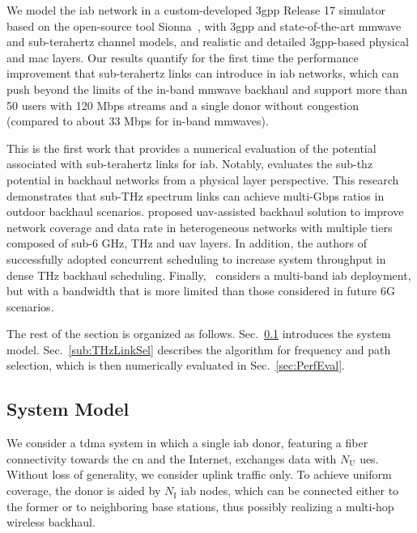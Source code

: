 We model the \gls{iab} network in a custom-developed \gls{3gpp} Release 17 simulator based on the open-source tool Sionna~\cite{hoydis2022sionna}, with \gls{3gpp} and state-of-the-art \gls{mmwave} and sub-terahertz channel models, and realistic and detailed \gls{3gpp}-based physical and \gls{mac} layers. Our results quantify for the first time the performance improvement that sub-terahertz links can introduce in \gls{iab} networks, which can push beyond the limits of the in-band \gls{mmwave} backhaul and support more than 50 users with 120 Mbps streams and a single donor without congestion (compared to about 33 Mbps for in-band \glspl{mmwave}). 

This is the first work that provides a numerical evaluation of the potential associated with sub-terahertz links for \gls{iab}. Notably, \cite{9135258} evaluates the sub-\gls{thz} potential in backhaul networks from a physical layer perspective. This research demonstrates that sub-THz spectrum links can achieve multi-Gbps ratios in outdoor backhaul scenarios. \cite{9163026} proposed \gls{uav}-assisted backhaul solution to improve network coverage and data rate in heterogeneous networks with multiple tiers composed of sub-6 GHz, THz and \gls{uav} layers. In addition, the authors of \cite{9136652} successfully adopted concurrent scheduling to increase system throughput in dense THz backhaul scheduling. Finally,~\cite{saha2018integrated} considers a multi-band \gls{iab} deployment, but with a bandwidth that is more limited than those considered in future 6G scenarios. 

The rest of the section is organized as follows. Sec.~\ref{sec:system} introduces the system model. Sec.~\ref{sub:THzLinkSel} describes the algorithm for frequency and path selection, which is then numerically evaluated in Sec.~\ref{sec:PerfEval}.


\subsection{System Model}
\label{sec:system}

We consider a \gls{tdma} system in which a single \gls{iab} donor, featuring a fiber connectivity towards the \gls{cn} and the Internet, exchanges data with $N_{\mathrm{U}}$ \glspl{ue}. Without loss of generality, we consider uplink traffic only.
To achieve uniform coverage, the donor is aided by $N_{\mathrm{I}}$ \gls{iab} nodes, which can be connected either to the former or to neighboring base stations, thus possibly realizing a multi-hop wireless backhaul. 

